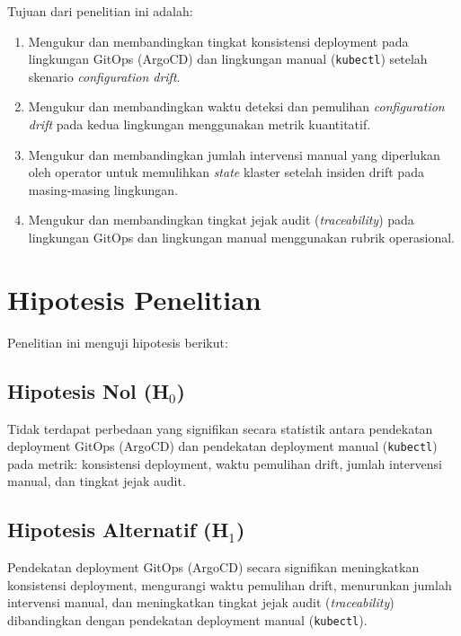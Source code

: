 Tujuan dari penelitian ini adalah:

\begin{enumerate}
  \item Mengukur dan membandingkan tingkat konsistensi deployment pada lingkungan GitOps (ArgoCD) dan lingkungan manual (\texttt{kubectl}) setelah skenario \textit{configuration drift}.
  
  \item Mengukur dan membandingkan waktu deteksi dan pemulihan \textit{configuration drift} pada kedua lingkungan menggunakan metrik kuantitatif.
  
  \item Mengukur dan membandingkan jumlah intervensi manual yang diperlukan oleh operator untuk memulihkan \textit{state} klaster setelah insiden drift pada masing-masing lingkungan.
  
  \item Mengukur dan membandingkan tingkat jejak audit (\textit{traceability}) pada lingkungan GitOps dan lingkungan manual menggunakan rubrik operasional.
\end{enumerate}

\section{Hipotesis Penelitian}

Penelitian ini menguji hipotesis berikut:

\subsection{Hipotesis Nol (H$_0$)}

Tidak terdapat perbedaan yang signifikan secara statistik antara pendekatan deployment GitOps (ArgoCD) dan pendekatan deployment manual (\texttt{kubectl}) pada metrik: konsistensi deployment, waktu pemulihan drift, jumlah intervensi manual, dan tingkat jejak audit.

\subsection{Hipotesis Alternatif (H$_1$)}

Pendekatan deployment GitOps (ArgoCD) secara signifikan meningkatkan konsistensi deployment, mengurangi waktu pemulihan drift, menurunkan jumlah intervensi manual, dan meningkatkan tingkat jejak audit (\textit{traceability}) dibandingkan dengan pendekatan deployment manual (\texttt{kubectl}).

